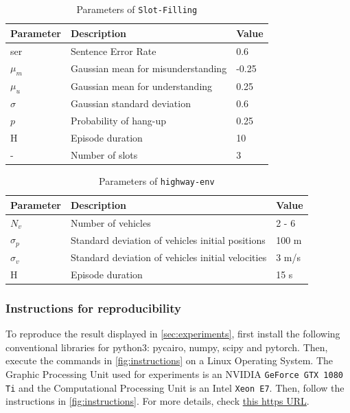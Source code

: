 \begin{table}[ht!]
    \centering
    \begin{tabular}{lll}
        \toprule
        Parameter & Description & Value\tabularnewline
        \midrule
        ser & Sentence Error Rate & 0.6\tabularnewline
        $\mu_m$& Gaussian mean for misunderstanding & -0.25\tabularnewline
        $\mu_u$& Gaussian mean for understanding & 0.25\tabularnewline
        $\sigma$& Gaussian standard deviation & 0.6\tabularnewline
        $p$& Probability of hang-up & 0.25\tabularnewline
        H & Episode duration & 10\tabularnewline
        - & Number of slots & 3\tabularnewline
        \bottomrule
    \end{tabular}
    \caption{Parameters of \texttt{Slot-Filling}}
    \label{tab:param-slot-filling}
\end{table}


\begin{table}[ht!]
    \centering
    \begin{tabular}{lll}
        \toprule
        Parameter & Description & Value\tabularnewline
        \midrule
        $N_v$& Number of vehicles & 2 - 6\tabularnewline
        $\sigma_p$& Standard deviation of vehicles initial positions & 100 m\tabularnewline
        $\sigma_v$& Standard deviation of vehicles initial velocities & 3 m/s\tabularnewline
        H & Episode duration & 15 s\tabularnewline
        \bottomrule
    \end{tabular}

    \caption{Parameters of \texttt{highway-env}}
    \label{tab:param-highway-env}
\end{table}

\subsubsection{Instructions for reproducibility}
\label{subsubsec:instruction-reproducibility}
To reproduce the result displayed in \autoref{sec:experiments}, first install the following conventional libraries for python3: pycairo, numpy, scipy and pytorch. Then, execute the commands in \autoref{fig:instructions} on a Linux Operating System. The Graphic Processing Unit used for experiments is an NVIDIA \texttt{GeForce GTX 1080 Ti} and the Computational Processing Unit is an Intel \texttt{Xeon E7}. Then, follow the instructions in \autoref{fig:instructions}. For more details, check  \href{https://budgeted-rl.github.io/\#how-to-reproduce}{this https URL}.

